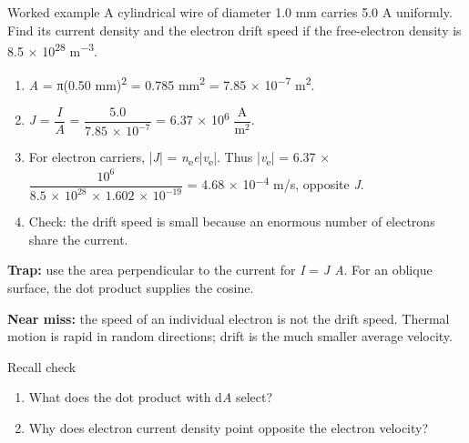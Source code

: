 \documentclass[11pt]{article}
\begin{document}
\begin{keepsection}
\begin{workedbox}{Worked example}
A cylindrical wire of diameter 1.0 mm carries 5.0 A uniformly. Find its current density and the electron drift speed if the free-electron density is 8.5 \ensuremath{\times} 10\textsuperscript{28} m\textsuperscript{\ensuremath{-}3}.

\begin{enumerate}
\item \textit{A} = π(0.50 mm)\textsuperscript{2} = 0.785 mm\textsuperscript{2} = 7.85 \ensuremath{\times} 10\textsuperscript{\ensuremath{-}7} m\textsuperscript{2}.
\item \textit{J} = {\small\ensuremath{\dfrac{{I}}{{A}}}} = {\small\ensuremath{\dfrac{5.0}{7.85\, \times \, 10^{-7}}}} = 6.37 \ensuremath{\times} 10\textsuperscript{6} {\small\ensuremath{\dfrac{\mathrm{A}}{\mathrm{m}^{2}}}}.
\item For electron carriers, |\textit{J}| = \textit{n}\textsubscript{e}\textit{e}|\textit{v}\textsubscript{e}|. Thus |\textit{v}\textsubscript{e}| = 6.37 \ensuremath{\times} {\small\ensuremath{\dfrac{10^{6}}{8.5\, \times \, 10^{28}\, \times \, 1.602\, \times \, 10^{-19}}}} = 4.68 \ensuremath{\times} 10\textsuperscript{\ensuremath{-}4} m/s, opposite \textit{J}.
\item Check: the drift speed is small because an enormous number of electrons share the current.
\end{enumerate}
\end{workedbox}

\begin{notebox}\textbf{Trap:} use the area perpendicular to the current for \textit{I} = \textit{J A}. For an oblique surface, the dot product supplies the cosine.\end{notebox}

\begin{notebox}\textbf{Near miss:} the speed of an individual electron is not the drift speed. Thermal motion is rapid in random directions; drift is the much smaller average velocity.\end{notebox}

\begin{recallbox}{Recall check}
\begin{enumerate}
\item What does the dot product with d\textit{A} select?
\item Why does electron current density point opposite the electron velocity?
\end{enumerate}

\end{recallbox}
\end{keepsection}
\end{document}
